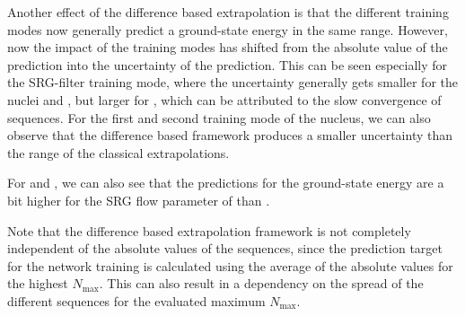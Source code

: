 


Another effect of the difference based extrapolation is that the different training modes now generally predict a ground-state energy in the same range. However, now the impact of the training modes has shifted from the absolute value of the prediction into the uncertainty of the prediction. This can be seen especially for the SRG-filter training mode, where the uncertainty generally gets smaller for the nuclei  and , but larger for , which can be attributed to the slow convergence of  sequences.
For the first and second training mode of the  nucleus, we can also observe that the difference based framework produces a smaller uncertainty than the range of the classical extrapolations.

For  and , we can also see that the predictions for the ground-state energy are a bit higher for the SRG flow parameter of  than .

Note that the difference based extrapolation framework is not completely independent of the absolute values of the sequences, since the prediction target for the network training is calculated using the average of the absolute values for the highest $N_\mathrm{max}$. This can also result in a dependency on the spread of the different sequences for the evaluated maximum $N_\mathrm{max}$.

